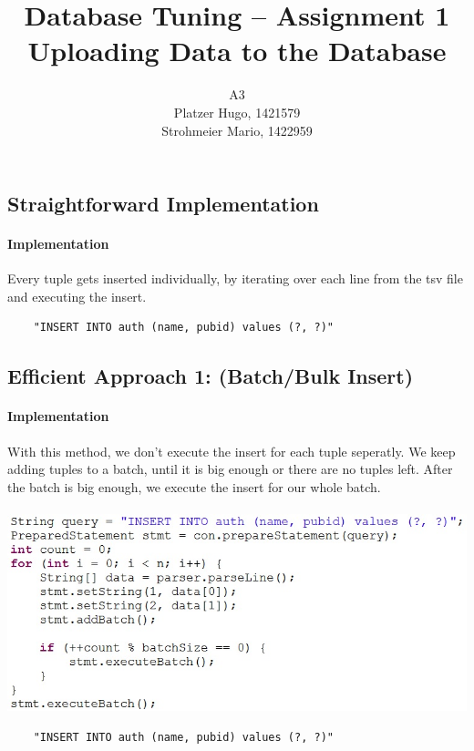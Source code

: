 \documentclass[11pt]{scrartcl}
\title{
  \textbf{\large Database Tuning -- Assignment 1}\\
  Uploading Data to the Database
}
\author{
 A3\\
 \large Platzer Hugo, 1421579 \\
 \large Strohmeier Mario, 1422959 \\
}
\begin{document}
\maketitle

\subsection*{Straightforward Implementation}

  \paragraph{Implementation}

  Every tuple gets inserted individually, by iterating over each line from the tsv file and executing the insert.

{\small
\begin{verbatim}
    "INSERT INTO auth (name, pubid) values (?, ?)"
\end{verbatim}
}

  \subsection*{Efficient Approach 1: (Batch/Bulk Insert)}

  \paragraph{Implementation}

  With this method, we don't execute the insert for each tuple seperatly. We keep adding tuples to a batch, until it is big enough or there are no tuples left. After the batch is big enough, we execute the insert for our whole batch.\\\\
  \includegraphics{batch.jpg}


{\small
\begin{verbatim}
    "INSERT INTO auth (name, pubid) values (?, ?)"
\end{verbatim}
}
\end{document}
